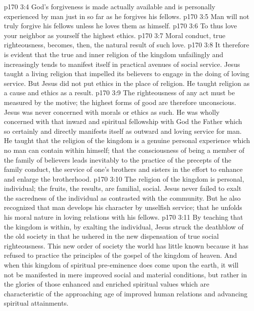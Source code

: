 \pc \vs p170 3:4 \bibnobreakspace God’s forgiveness is made actually available and is personally experienced by man just in so far as he forgives his fellows.
\vs p170 3:5 \bibnobreakspace Man will not truly forgive his fellows unless he loves them as himself.
\vs p170 3:6 \bibnobreakspace To thus love your neighbor as yourself  the highest ethics.
\vs p170 3:7 \bibnobreakspace Moral conduct, true righteousness, becomes, then, the natural result of such love.
\pc \vs p170 3:8 It therefore is evident that the true and inner religion of the kingdom unfailingly and increasingly tends to manifest itself in practical avenues of social service. Jesus taught a living religion that impelled its believers to engage in the doing of loving service. But Jesus did not put ethics in the place of religion. He taught religion as a cause and ethics as a result.
\vs p170 3:9 The righteousness of any act must be measured by the motive; the highest forms of good are therefore unconscious. Jesus was never concerned with morals or ethics as such. He was wholly concerned with that inward and spiritual fellowship with God the Father which so certainly and directly manifests itself as outward and loving service for man. He taught that the religion of the kingdom is a genuine personal experience which no man can contain within himself; that the consciousness of being a member of the family of believers leads inevitably to the practice of the precepts of the family conduct, the service of one’s brothers and sisters in the effort to enhance and enlarge the brotherhood.
\vs p170 3:10 The religion of the kingdom is personal, individual; the fruits, the results, are familial, social. Jesus never failed to exalt the sacredness of the individual as contrasted with the community. But he also recognized that man develops his character by unselfish service; that he unfolds his moral nature in loving relations with his fellows.
\vs p170 3:11 By teaching that the kingdom is within, by exalting the individual, Jesus struck the deathblow of the old society in that he ushered in the new dispensation of true social righteousness. This new order of society the world has little known because it has refused to practice the principles of the gospel of the kingdom of heaven. And when this kingdom of spiritual pre\hyp{}eminence does come upon the earth, it will not be manifested in mere improved social and material conditions, but rather in the glories of those enhanced and enriched spiritual values which are characteristic of the approaching age of improved human relations and advancing spiritual attainments.
